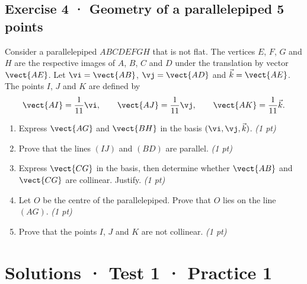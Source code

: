 \subsection*{Exercise 4 · Geometry of a parallelepiped \hfill 5 points}Consider a parallelepiped $ABCDEFGH$ that is not flat. The vertices $E$, $F$, $G$ and $H$ are the respective images of $A$, $B$, $C$ and $D$ under the translation by vector $\vect{AE}$.
Let $\vi=\vect{AB}$, $\vj=\vect{AD}$ and $\vec k=\vect{AE}$.
The points $I$, $J$ and $K$ are defined by
\[\vect{AI}=\frac1{11}\vi,\qquad\vect{AJ}=\frac1{11}\vj,\qquad\vect{AK}=\frac1{11}\vec k.\]

\begin{enumerate}

\item Express $\vect{AG}$ and $\vect{BH}$ in the basis $(\vi,\vj,\vec k)$. \hfill\textit{(1 pt)}

\item Prove that the lines $(IJ)$ and $(BD)$ are parallel. \hfill\textit{(1 pt)}

\item Express $\vect{CG}$ in the basis, then determine whether $\vect{AB}$ and $\vect{CG}$ are collinear. Justify. \hfill\textit{(1 pt)}

\item Let $O$ be the centre of the parallelepiped. Prove that $O$ lies on the line $(AG)$. \hfill\textit{(1 pt)}

\item Prove that the points $I$, $J$ and $K$ are not collinear. \hfill\textit{(1 pt)}

\end{enumerate}

\ifmxteacher\mxnewpage

\section*{Solutions · Test 1 · Practice 1}\label{cor:1-1}

